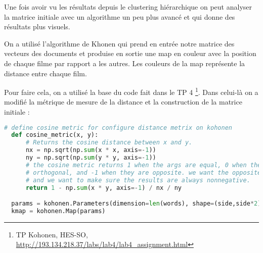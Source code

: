 Une fois avoir vu les résultats depuis le clustering hiérarchique on peut analyser la matrice initiale avec un algorithme un peu plus avancé et qui donne des résultats plus visuels.

On a utilisé l'algorithme de Khonen qui prend en entrée notre matrice des vecteurs des documents et produise en sortie une map en couleur avec la position de chaque filme par rapport a les autres. Les couleurs de la map représente la distance entre chaque film. 

Pour faire cela, on a utilisé la base du code fait dans le TP 
4 \footnote{TP Kohonen, HES-SO, \url{http://193.134.218.37/labs/lab4/lab4_assignment.html}}. Dans celui-là  on a modifié la métrique de mesure de la distance et la construction de la matrice initiale : \\

\begin{lstlisting}[language=python]
  # define cosine metric for configure distance metrix on kohonen
  def cosine_metric(x, y):
      # Returns the cosine distance between x and y.
      nx = np.sqrt(np.sum(x * x, axis=-1))
      ny = np.sqrt(np.sum(y * y, axis=-1))
      # the cosine metric returns 1 when the args are equal, 0 when they are
      # orthogonal, and -1 when they are opposite. we want the opposite effect,
      # and we want to make sure the results are always nonnegative.
      return 1 - np.sum(x * y, axis=-1) / nx / ny

  params = kohonen.Parameters(dimension=len(words), shape=(side,side*2), metric=cosine_metric)
  kmap = kohonen.Map(params)
\end{lstlisting}






